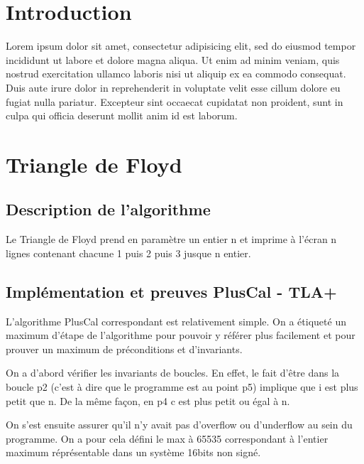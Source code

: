\documentclass[a4paper,11pt, oneside]{book}
\author{Romain Cahu, Victor Cholley-Barroyer, Yann Prono, Quentin Tardivon}
\date{\today}
\begin{document}
	\begin{titlepage}
		
	\end{titlepage}

	\newpage\newpage\null\thispagestyle{empty}
	\newpage
		\tableofcontents
		\thispagestyle{empty}

	\chapter{Introduction}
	\setcounter{page}{1}
		Lorem ipsum dolor sit amet, consectetur adipisicing elit, sed do eiusmod tempor incididunt ut labore et dolore magna aliqua. Ut enim ad minim veniam, quis nostrud exercitation ullamco laboris nisi ut aliquip ex ea commodo consequat. Duis aute irure dolor in reprehenderit in voluptate velit esse cillum dolore eu fugiat nulla pariatur. Excepteur sint occaecat cupidatat non proident, sunt in culpa qui officia deserunt mollit anim id est laborum.

	\chapter{Triangle de Floyd}

		\section{Description de l'algorithme}

		Le Triangle de Floyd prend en paramètre un entier n et imprime à l'écran
		n lignes contenant chacune 1 puis 2 puis 3 jusque n entier.


		\section{Implémentation et preuves PlusCal - TLA+}

			L'algorithme PlusCal correspondant est relativement simple. On a étiqueté
			un maximum d'étape de l'algorithme pour pouvoir y référer plus facilement
			et pour prouver un maximum de préconditions et d'invariants.

			On a d'abord vérifier les invariants de boucles. En effet, le fait d'être
			dans la boucle p2 (c'est à dire que le programme est au point p5) implique
			que i est plus petit que n. De la même façon, en p4 c est plus petit ou égal
			à n.

			On s'est ensuite assurer qu'il n'y avait pas d'overflow ou d'underflow au sein
			du programme. On a pour cela défini le max à 65535 correspondant à l'entier
			maximum réprésentable dans un système 16bits non signé.
\end{document}

